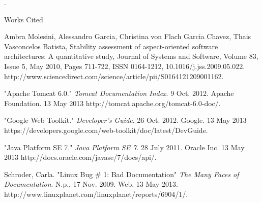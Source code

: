 \documentclass[12pt,a4paper]{article}
\newcommand{\bibent}{\noindent \hangindent 40pt}
\newenvironment{workscited}{ \doublespacing \newpage \begin{center} Works Cited \end{center}}{\newpage }
\begin{document}
 \newpage.
\begin{workscited}

  \bibent
 Ambra Molesini, Alessandro Garcia, Christina von Flach Garcia Chavez, Thais Vasconcelos Batista, Stability assessment of aspect-oriented software architectures: A quantitative study, Journal of Systems and Software, Volume 83, Issue 5, May 2010, Pages 711-722, ISSN 0164-1212, 10.1016/j.jss.2009.05.022.
\\http://www.sciencedirect.com/science/article/pii/S0164121209001162. 

 \bibent
 "Apache Tomcat 6.0." \textit{Tomcat Documentation Index}. 9 Oct. 2012. Apache Foundation.  13 May 2013 http://tomcat.apache.org/tomcat-6.0-doc/. 

 \bibent
 "Google Web Toolkit." \textit{Developer's Guide}. 26 Oct. 2012. Google. 13 May 2013 \\https://developers.google.com/web-toolkit/doc/latest/DevGuide. 

 \bibent
 "Java Platform SE 7." \textit{Java Platform SE 7}. 28 July 2011. Oracle Inc. 13 May 2013 http://docs.oracle.com/javase/7/docs/api/. 


 \bibent
  Schroder, Carla. "Linux Bug \# 1: Bad Documentation" \textit{The Many Faces of Documentation}. N.p., 17 Nov. 2009. Web. 13 May 2013.\\ http://www.linuxplanet.com/linuxplanet/reports/6904/1/. 


 \end{workscited}
\end{document}
